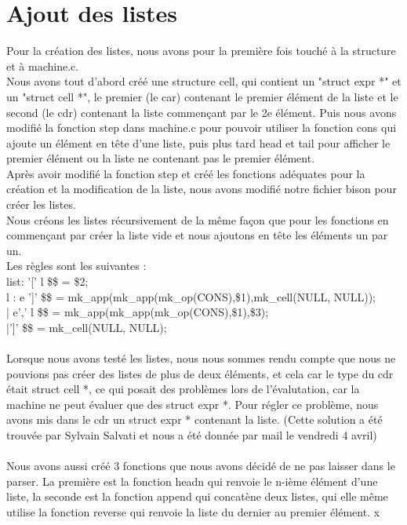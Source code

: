 \documentclass{report}
\begin{document}
\part{Ajout des listes}
Pour la création des listes, nous avons pour la première fois touché à la structure et à machine.c.\\
Nous avons tout d'abord créé une structure cell, qui contient un "struct expr *" et un "struct cell *", le premier (le car) contenant le premier élément de la liste et le second (le cdr) contenant la liste commençant par le 2e élément. Puis nous avons modifié la fonction step dans machine.c pour pouvoir utiliser la fonction cons qui ajoute un élément en tête d'une liste, puis plus tard head et tail pour afficher le premier élément ou la liste ne contenant pas le premier élément.\\
Après avoir modifié la fonction step et créé les fonctions adéquates pour la création et la modification de la liste, nous avons modifié notre fichier bison pour créer les listes.\\
Nous créons les listes récursivement de la même façon que pour les fonctions en commençant par créer la liste vide et nous ajoutons en tête les éléments un par un.\\
Les règles sont les suivantes :\\
list: '[' l {\$\$ = \$2;}\\
l : e ']'   {\$\$ = mk\_app(mk\_app(mk\_op(CONS),\$1),mk\_cell(NULL, NULL));}\\
| e',' l    {\$\$ = mk\_app(mk\_app(mk\_op(CONS),\$1),\$3);}\\
|']'        {\$\$ = mk\_cell(NULL, NULL);}\\
\\
Lorsque nous avons testé les listes, nous nous sommes rendu compte que nous ne pouvions pas créer des listes de plus de deux éléments, et cela car le type du cdr était struct cell *, ce qui posait des problèmes lors de l'évalutation, car la machine ne peut évaluer que des struct expr *. Pour régler ce problème, nous avons mis dans le cdr un struct expr * contenant la liste. (Cette solution a été trouvée par Sylvain Salvati et nous a été donnée par mail le vendredi 4 avril)\\
\\
Nous avons aussi créé 3 fonctions que nous avons décidé de ne pas laisser dans le parser. La première est la fonction headn qui renvoie le n-ième élément d'une liste, la seconde est la fonction append qui concatène deux listes, qui elle même utilise la fonction reverse qui renvoie la liste du dernier au premier élément.
x
\end{document}
